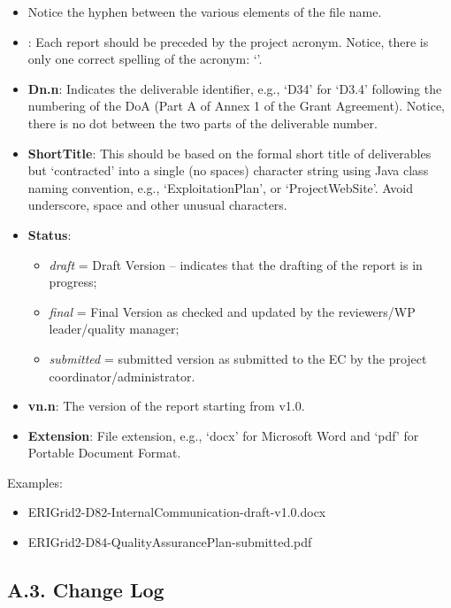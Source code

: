 \begin{itemize}
	\item Notice the hyphen between the various elements of the file name.
    \item {\bf \teams}: Each \teams report should be preceded by the project acronym. Notice, there is only one correct spelling of the acronym: ‘\teams’. 
    \item {\bf Dn.n}: Indicates the deliverable identifier, e.g., ‘D34’ for ‘D3.4’ following the numbering of the \ac{DoA} (Part A of Annex 1 of the Grant Agreement). Notice, there is no dot between the two parts of the deliverable number.
    \item {\bf ShortTitle}: This should be based on the formal short title of deliverables but ‘contracted’ into a single (no spaces) character string using Java class naming convention, e.g., ‘ExploitationPlan’,  or ‘ProjectWebSite’. Avoid underscore, space and other unusual characters.
	\item {\bf Status}: 
	\begin{itemize}
		\item \textit{draft} = Draft Version – indicates that the drafting of the report is in progress; 
		\item \textit{final} = Final Version as checked and updated by the reviewers/WP leader/quality manager; 
		\item \textit{submitted} = submitted version as submitted to the EC by the project coordinator/administrator.
	\end{itemize}
	\item {\bf vn.n}: The version of the report starting from v1.0. 
    \item {\bf Extension}: File extension, e.g., ‘docx’ for Microsoft Word and ‘pdf’ for Portable Document Format. 
\end{itemize}

Examples:

\begin{itemize}
    \item ERIGrid2-D82-InternalCommunication-draft-v1.0.docx
    \item ERIGrid2-D84-QualityAssurancePlan-submitted.pdf
\end{itemize}

\subsection*{A.3. Change Log}
\label{sec:appendix-a3-change-log}

